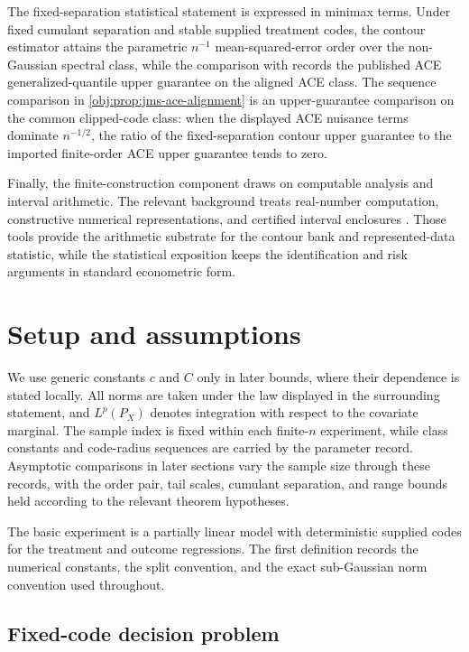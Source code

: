 \documentclass[11pt]{article}
\begin{document}
The fixed-separation statistical statement is expressed in minimax terms. Under fixed cumulant separation and stable supplied treatment codes, the contour estimator attains the parametric \(n^{-1}\) mean-squared-error order over the non-Gaussian spectral class, while the comparison with \citet{JinMackeySyrgkanis2025} records the published ACE generalized-quantile upper guarantee on the aligned ACE class. The sequence comparison in \cref{obj:prop:jms-ace-alignment} is an upper-guarantee comparison on the common clipped-code class: when the displayed ACE nuisance terms dominate \(n^{-1/2}\), the ratio of the fixed-separation contour upper guarantee to the imported finite-order ACE upper guarantee tends to zero.

Finally, the finite-construction component draws on computable analysis and interval arithmetic. The relevant background treats real-number computation, constructive numerical representations, and certified interval enclosures \citep{Weihrauch2000,Ko1991,Moore1966}. Those tools provide the arithmetic substrate for the contour bank and represented-data statistic, while the statistical exposition keeps the identification and risk arguments in standard econometric form.


\section{Setup and assumptions}

We use generic constants \(c\) and \(C\) only in later bounds, where their dependence is stated locally. All norms are taken under the law displayed in the surrounding statement, and \(L^p(P_X)\) denotes integration with respect to the covariate marginal. The sample index is fixed within each finite-\(n\) experiment, while class constants and code-radius sequences are carried by the parameter record. Asymptotic comparisons in later sections vary the sample size through these records, with the order pair, tail scales, cumulant separation, and range bounds held according to the relevant theorem hypotheses.

The basic experiment is a partially linear model with deterministic supplied codes for the treatment and outcome regressions. The first definition records the numerical constants, the split convention, and the exact sub-Gaussian norm convention used throughout.

\subsection{Fixed-code decision problem}
\end{document}
